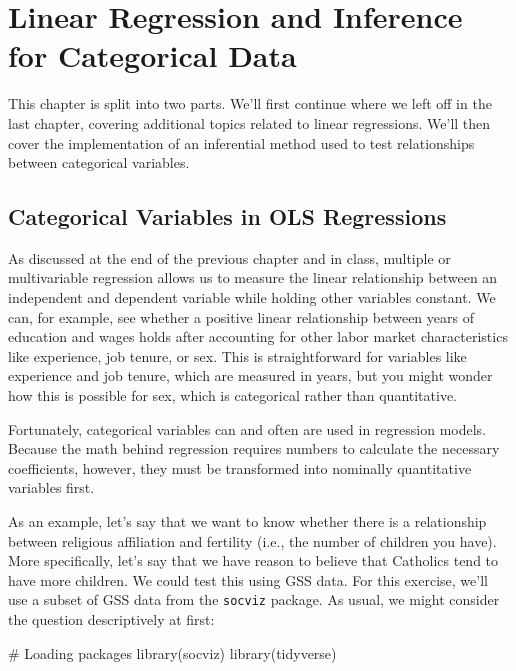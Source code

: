 \documentclass[
  letterpaper,
]{book}
\newenvironment{Shaded}{\begin{snugshade}}{\end{snugshade}}
\newcommand{\CommentTok}[1]{\textcolor[rgb]{0.37,0.37,0.37}{#1}}
\newcommand{\FunctionTok}[1]{\textcolor[rgb]{0.28,0.35,0.67}{#1}}
\newcommand{\NormalTok}[1]{\textcolor[rgb]{0.00,0.23,0.31}{#1}}
\begin{document}
\hypertarget{linear-regression-and-inference-for-categorical-data}{%
\chapter{Linear Regression and Inference for Categorical
Data}\label{linear-regression-and-inference-for-categorical-data}}

This chapter is split into two parts. We'll first continue where we left
off in the last chapter, covering additional topics related to linear
regressions. We'll then cover the implementation of an inferential
method used to test relationships between categorical variables.

\hypertarget{categorical-variables-in-ols-regressions}{%
\section{Categorical Variables in OLS
Regressions}\label{categorical-variables-in-ols-regressions}}

As discussed at the end of the previous chapter and in class, multiple
or multivariable regression allows us to measure the linear relationship
between an independent and dependent variable while holding other
variables constant. We can, for example, see whether a positive linear
relationship between years of education and wages holds after accounting
for other labor market characteristics like experience, job tenure, or
sex. This is straightforward for variables like experience and job
tenure, which are measured in years, but you might wonder how this is
possible for sex, which is categorical rather than quantitative.

Fortunately, categorical variables can and often are used in regression
models. Because the math behind regression requires numbers to calculate
the necessary coefficients, however, they must be transformed into
nominally quantitative variables first.

As an example, let's say that we want to know whether there is a
relationship between religious affiliation and fertility (i.e., the
number of children you have). More specifically, let's say that we have
reason to believe that Catholics tend to have more children. We could
test this using GSS data. For this exercise, we'll use a subset of GSS
data from the \texttt{socviz} package. As usual, we might consider the
question descriptively at first:

\begin{Shaded}
\begin{Highlighting}[]
\CommentTok{\# Loading packages}
\FunctionTok{library}\NormalTok{(socviz)}
\FunctionTok{library}\NormalTok{(tidyverse)}
\end{Highlighting}
\end{Shaded}
\end{document}
